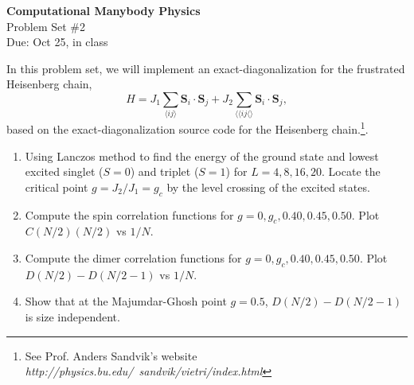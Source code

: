 \documentclass[12pt]{article}
\begin{document}
\begin{center}
\Large
\textbf{Computational Manybody Physics}\\
\large
Problem Set \#2\\
Due: Oct 25, in class

\end{center}
In this problem set, we will implement an exact-diagonalization for the frustrated Heisenberg chain, 
\[
H=J_1\sum_{\langle ij\rangle} \mathbf{S}_i \cdot \mathbf{S}_j +J_2 \sum_{\langle\langle ij\langle\rangle} \mathbf{S}_i \cdot \mathbf{S}_j ,
\]
based on the exact-diagonalization source code for the Heisenberg chain.\footnote{ See Prof. Anders Sandvik's website \textit{http://physics.bu.edu/~sandvik/vietri/index.html}}. 

\begin{enumerate} 
\item Using Lanczos method to find the energy of the ground state and lowest excited singlet ($S=0$) and triplet ($S=1$) for $L=4, 8, 16, 20$. Locate the critical point $g=J_2/J_1=g_c$ by the level crossing of the excited states.
\item Compute the spin correlation functions for $g=0,g_c,0.40,0.45,0.50$. Plot $C(N/2)(N/2)$ vs $1/N$.
\item Compute the dimer correlation functions for $g=0,g_c,0.40,0.45,0.50$. Plot $D(N/2)-D(N/2-1)$ vs $1/N$.
\item Show that at the Majumdar-Ghosh point $g=0.5$, $D(N/2)-D(N/2-1)$ is size independent.
\end{enumerate}
\end{document}
